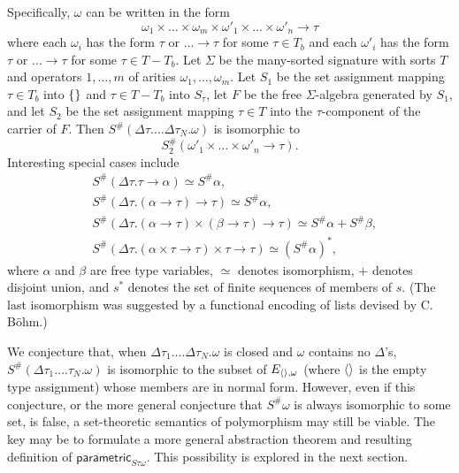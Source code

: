 \documentclass[sigplan,screen,nonacm,balance=false]{acmart}
\theoremstyle{plain}
\DeclarePairedDelimiter{\set}{\{}{\}}
\DeclarePairedDelimiter{\pair}{\langle}{\rangle}
\newcommand{\para}{\mathsf{parametric}}
\begin{document}
Specifically, $\omega$ can be written in the form
%
\begin{equation*}
  \omega_1 \times \dots \times \omega_m \times \omega'_1 \times \dots \times \omega'_n \to \tau
\end{equation*}
%
where each $\omega_i$ has the form $\tau$ or $\dots \to \tau$ for some $\tau \in T_b$ and each $\omega'_i$ has the form $\tau$ or $\dots \to \tau$ for some $\tau \in T - T_b$.
Let $\Sigma$ be the many-sorted signature with sorts $T$ and operators $1, \dots, m$ of arities $\omega_1, \dots, \omega_m$.
Let $S_1$ be the set assignment mapping $\tau \in T_b$ into $\set{}$ and $\tau \in T - T_b$ into $S_\tau$, let $F$ be the free $\Sigma$-algebra generated by $S_1$, and let $S_2$ be the set assignment mapping $\tau \in T$ into the $\tau$-component of the carrier of $F$.
Then $S^\#(\Delta \tau. \dots \Delta \tau_N. \omega)$ is isomorphic to
%
\begin{equation*}
  S^\#_2(\omega'_1 \times \dots \times \omega'_n \to \tau).
\end{equation*}
%
Interesting special cases include
%
\begin{align*}
  & S^\#(\Delta \tau. \tau \to \alpha) \simeq S^\# \alpha, \\
  & S^\#(\Delta \tau. (\alpha \to \tau) \to \tau) \simeq S^\# \alpha, \\
  & S^\#(\Delta \tau. (\alpha \to \tau) \times (\beta \to \tau) \to \tau) \simeq S^\# \alpha + S^\# \beta, \\
  & S^\#(\Delta \tau. (\alpha \times \tau \to \tau) \times \tau \to \tau) \simeq (S^\# \alpha)^*,
\end{align*}
%
where $\alpha$ and $\beta$ are free type variables, $\simeq$ denotes isomorphism, $+$ denotes disjoint union, and $s^*$ denotes the set of finite sequences of members of $s$.
(The last isomorphism was suggested by a functional encoding of lists devised by C. B\"ohm.)

We conjecture that, when $\Delta \tau_1. \dots \Delta \tau_N. \omega$ is closed and $\omega$ contains no $\Delta$'s, $S^\#(\Delta \tau_1. \dots \tau_N. \omega)$ is isomorphic to the subset of $E_{\pair{}, \omega}$ (where $\pair{}$ is the empty type assignment) whose members are in normal form.
However, even if this conjecture, or the more general conjecture that $S^\# \omega$ is always isomorphic to some set, is false, a set-theoretic semantics of polymorphism may still be viable.
The key may be to formulate a more general abstraction theorem and resulting definition of $\para_{S \tau \omega}$.
This possibility is explored in the next section.
\end{document}
